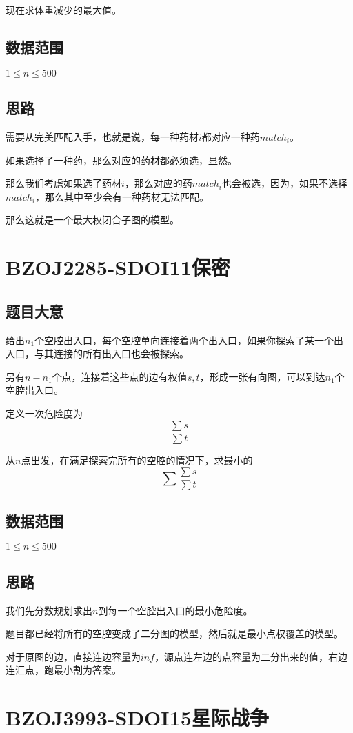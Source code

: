 \documentclass{ctexart}
\numberwithin{equation}{section}
\begin{document}
\begin{flushleft}
  现在求体重减少的最大值。
  
  \subsection{数据范围}
  $1\le n \le 500$
  \subsection{思路}
  需要从完美匹配入手，也就是说，每一种药材$i$都对应一种药$match_i$。

  如果选择了一种药，那么对应的药材都必须选，显然。

  那么我们考虑如果选了药材$i$，那么对应的药$match_i$也会被选，因为，如果不选择$match_i$，那么其中至少会有一种药材无法匹配。

  那么这就是一个最大权闭合子图的模型。
  \newpage
   
  \section{BZOJ2285-SDOI11保密}
  \subsection{题目大意}
  给出$n_1$个空腔出入口，每个空腔单向连接着两个出入口，如果你探索了某一个出入口，与其连接的所有出入口也会被探索。

  另有$n-n_1$个点，连接着这些点的边有权值$s,t$，形成一张有向图，可以到达$n_1$个空腔出入口。

  定义一次危险度为$$\frac{\sum s}{\sum t} $$
  
  从$n$点出发，在满足探索完所有的空腔的情况下，求最小的$$\sum \frac{\sum s}{\sum t}$$
  
  \subsection{数据范围}
  $1\le n \le 500$
  \subsection{思路}
  我们先分数规划求出$n$到每一个空腔出入口的最小危险度。

  题目都已经将所有的空腔变成了二分图的模型，然后就是最小点权覆盖的模型。

  对于原图的边，直接连边容量为$inf$，源点连左边的点容量为二分出来的值，右边连汇点，跑最小割为答案。
  \newpage

  \section{BZOJ3993-SDOI15星际战争}

\end{flushleft}
\end{document}

